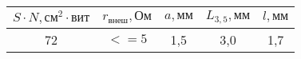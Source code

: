 \begin{tabular}{ccccc}
\toprule
$S\cdot N, \text{см}^2\cdot\text{вит}$ & $r_\text{внеш}, \text{Ом}$ &  $a, \text{мм}$ &  $L_{3,5}, \text{мм}$ &  $l, \text{мм}$ \\
\midrule
72 & $<=5$ & 1,5 & 3,0 & 1,7 \\
\bottomrule
\end{tabular}